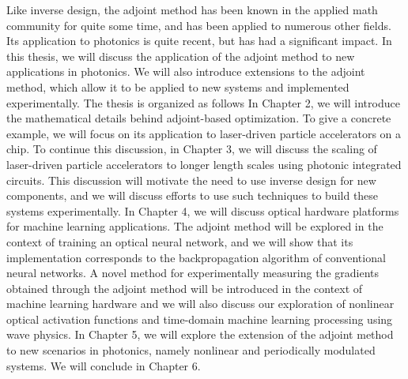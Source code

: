 Like inverse design, the adjoint method has been known in the applied math community for quite some time, and has been applied to numerous other fields.
Its application to photonics is quite recent, but has had a significant impact.
In this thesis, we will discuss the application of the adjoint method to new applications in photonics.
We will also introduce extensions to the adjoint method, which allow it to be applied to new systems and implemented experimentally.
The thesis is organized as follows
In Chapter 2, we will introduce the mathematical details behind adjoint-based optimization.  
To give a concrete example, we will focus on its application to laser-driven particle accelerators on a chip.
To continue this discussion, in Chapter 3, we will discuss the scaling of laser-driven particle accelerators to longer length scales using photonic integrated circuits.
This discussion will motivate the need to use inverse design for new components, and we will discuss efforts to use such techniques to build these systems experimentally.
In Chapter 4, we will discuss optical hardware platforms for machine learning applications.
The adjoint method will be explored in the context of training an optical neural network, and we will show that its implementation corresponds to the backpropagation algorithm of conventional neural networks.
A novel method for experimentally measuring the gradients obtained through the adjoint method will be introduced in the context of machine learning hardware and we will also discuss our exploration of nonlinear optical activation functions and time-domain machine learning processing using wave physics.
In Chapter 5, we will explore the extension of the adjoint method to new scenarios in photonics, namely nonlinear and periodically modulated systems.
We will conclude in Chapter 6.
